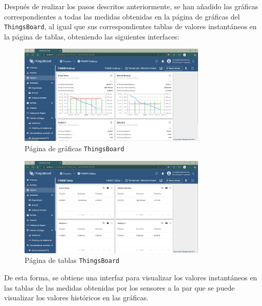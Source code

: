 Después de realizar los pasos descritos anteriormente, se han añadido las gráficas correspondientes a todas las medidas obtenidas en la página de gráficas del \texttt{ThingsBoard}, al igual que sus correspondientes tablas de valores instantáneos en la página de tablas, obteniendo las siguientes interfaces:
\begin{figure}[H]
    \centering
    \includegraphics[width=0.8\textwidth]{images/3-software/3-2-2-thingsboard/PaginaGraficas.jpg}
    \caption{Página de gráficas \texttt{ThingsBoard}}
    \label{fig:3-2-2-PaginaGraficasThingsBoard}
\end{figure}

\begin{figure}[H]
    \centering
    \includegraphics[width=0.8\textwidth]{images/3-software/3-2-2-thingsboard/PaginaTablas.jpg}
    \caption{Página de tablas \texttt{ThingsBoard}}
    \label{fig:3-2-2-PaginaTablasThingsBoard}
\end{figure}

De esta forma, se obtiene una interfaz para visualizar los valores instantáneos en las tablas de las medidas obtenidas por los sensores a la par que se puede visualizar los valores históricos en las gráficas.